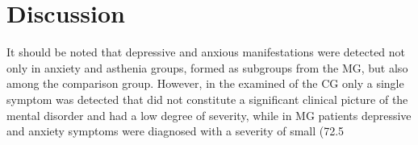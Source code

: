 \documentclass[twocolumn]{article}
\begin{document}
\section {Discussion}
\par It should be noted that depressive and anxious manifestations were detected not only in anxiety and asthenia groups, formed as subgroups from the MG, but also among the comparison group. However, in the examined of the CG only a single symptom was detected that did not constitute a significant clinical picture of the mental disorder and had a low degree of severity, while in MG patients depressive and anxiety symptoms were diagnosed with a severity of small (72.5%
\end{document}
